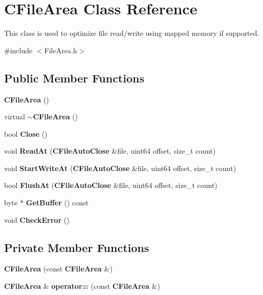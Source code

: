 \section{CFileArea Class Reference}
\label{classCFileArea}


This class is used to optimize file read/write using mapped memory if supported.  


{\ttfamily \#include $<$FileArea.h$>$}\subsection*{Public Member Functions}
\begin{DoxyCompactItemize}
\item 
{\bf CFileArea} ()\label{classCFileArea_a8d39e9694a909e080ae6500861c3cb25}

\item 
virtual {\bf $\sim$CFileArea} ()\label{classCFileArea_a761b132899b3a4987998becaab6b01c3}

\item 
bool {\bf Close} ()\label{classCFileArea_aefc237fd82a49ce3331bc009bf6b1659}

\item 
void {\bf ReadAt} ({\bf CFileAutoClose} \&file, uint64 offset, size\_\-t count)
\item 
void {\bf StartWriteAt} ({\bf CFileAutoClose} \&file, uint64 offset, size\_\-t count)\label{classCFileArea_a0d9669a816064a8a3482bc33ed4424b8}

\item 
bool {\bf FlushAt} ({\bf CFileAutoClose} \&file, uint64 offset, size\_\-t count)\label{classCFileArea_a1b4bcf077a9e0e5258a8a08074cec522}

\item 
byte $\ast$ {\bf GetBuffer} () const 
\item 
void {\bf CheckError} ()\label{classCFileArea_a5ab340f8a3c58b5def7d4b2e2ed61484}

\end{DoxyCompactItemize}
\subsection*{Private Member Functions}
\begin{Indent}{\bf }\par
{\em \label{_amgrpd41d8cd98f00b204e9800998ecf8427e}
 }\begin{DoxyCompactItemize}
\item 
{\bf CFileArea} (const {\bf CFileArea} \&)\label{classCFileArea_ad272235f664c9112154e63612ee52a74}

\item 
{\bf CFileArea} \& {\bfseries operator=} (const {\bf CFileArea} \&)\label{classCFileArea_a5b9a2427f1996eae9f2a9a2900283432}

\end{DoxyCompactItemize}
\end{Indent}
